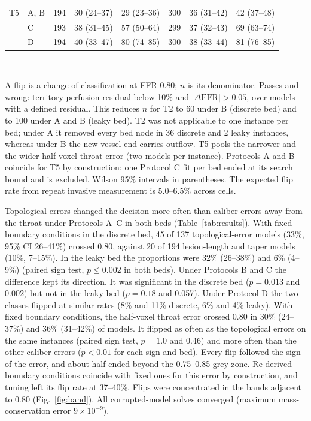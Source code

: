\documentclass[journal,twoside,web]{ieeecolor}
\begin{document}
\begin{table}[!t]
\begin{tabular}{@{}llrccrcc@{}}
\addlinespace[2pt]
T5 & A, B & 194 & 30 (24--37) & 29 (23--36) & 300 & 36 (31--42) & 42 (37--48) \\
 & C & 193 & 38 (31--45) & 57 (50--64) & 299 & 37 (32--43) & 69 (63--74) \\
 & D & 194 & 40 (33--47) & 80 (74--85) & 300 & 38 (33--44) & 81 (76--85) \\
\bottomrule
\end{tabular}
\\[2pt]
\parbox{\textwidth}{\footnotesize A flip is a change of classification at FFR 0.80; $n$ is its denominator. Passes and wrong: territory-perfusion residual below 10\% and $|\Delta\mathrm{FFR}| > 0.05$, over models with a
defined residual. This reduces $n$ for T2 to 60 under B (discrete bed) and to 100 under A and B (leaky bed). T2 was not applicable to one instance per bed; under A it removed every bed node in 36 discrete and 2 leaky instances, whereas under B the new vessel end carries outflow. T5 pools the narrower and the wider half-voxel throat error (two models per instance). Protocols A and B coincide for T5 by construction; one Protocol C fit per bed ended at its search bound and is excluded. Wilson 95\% intervals in parentheses. The expected flip
rate from repeat invasive measurement is 5.0--6.5\% across cells.}
\end{table}

Topological errors changed the decision more often than caliber errors away from the throat under Protocols A--C in both beds
(Table~\ref{tab:results}). With fixed boundary conditions in the discrete bed, 45 of 137 topological-error models
(33\%, 95\% CI 26--41\%) crossed 0.80, against 20 of 194 lesion-length and taper models (10\%, 7--15\%). In the leaky bed the
proportions were 32\% (26--38\%) and 6\% (4--9\%) (paired sign test, $p \leq 0.002$ in both beds). Under
Protocols B and C the difference kept its direction. It was significant in the discrete bed
($p = 0.013$ and 0.002) but not in the leaky bed ($p = 0.18$ and 0.057). Under Protocol D the two classes
flipped at similar rates (8\% and 11\% discrete, 6\% and 4\% leaky). With fixed boundary conditions, the half-voxel throat error crossed 0.80 in 30\% (24--37\%) and 36\% (31--42\%) of models. It flipped as often as the topological errors on the same instances (paired sign test, $p = 1.0$ and 0.46) and more often than the other caliber errors ($p < 0.01$ for each sign and bed). Every flip followed the sign of the error, and about half ended beyond the 0.75--0.85 grey zone. Re-derived boundary conditions coincide with fixed ones for this error by construction, and tuning left its
flip rate at 37--40\%. Flips were concentrated in the bands adjacent to 0.80 (Fig.~\ref{fig:band}). All corrupted-model solves converged (maximum mass-conservation error $9\times10^{-9}$).
\end{document}
